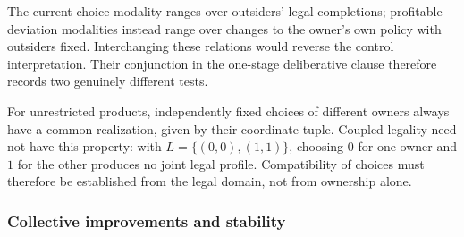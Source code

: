 \documentclass[11pt,a4paper]{article}
\numberwithin{equation}{section}
\theoremstyle{definition}
\theoremstyle{remark}
\theoremstyle{plain}
\begin{document}
The current-choice modality ranges over outsiders' legal
completions; profitable-deviation modalities instead range over changes
to the owner's own policy with outsiders fixed. Interchanging these
relations would reverse the control interpretation. Their conjunction in
the one-stage deliberative clause therefore records two genuinely
different tests.

For unrestricted products, independently fixed choices of different
owners always have a common realization, given by their coordinate
tuple. Coupled legality need not have this property: with
$L=\{(0,0),(1,1)\}$, choosing $0$ for one owner and $1$ for the
other produces no joint legal profile. Compatibility of choices must
therefore be established from the legal domain, not from ownership
alone.

\subsubsection{Collective improvements and stability}
\end{document}
